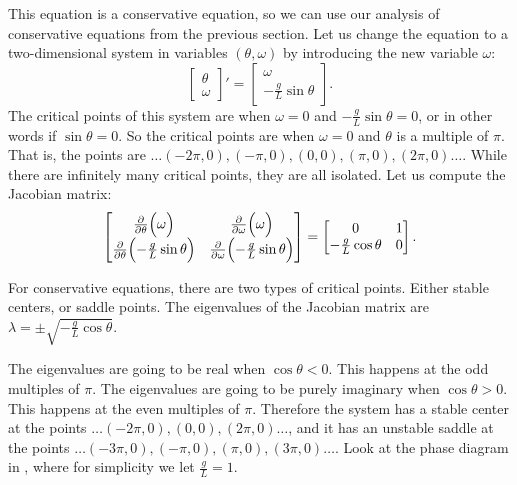 \begin{mywrapfigsimp}[8]{1.45in}{1.75in}
\noindent
{}
\end{mywrapfigsimp}
This equation is a conservative
equation, so we can use our analysis of conservative equations
from the previous section.
Let us change the equation to a two-dimensional
system in variables $(\theta,\omega)$ by introducing the new
variable $\omega$:
\begin{equation*}
\begin{bmatrix}
\theta \\ \omega
\end{bmatrix} '
=
\begin{bmatrix}
\omega \\
- \frac{g}{L} \sin \theta
\end{bmatrix} .
\end{equation*}
The critical points of this system are when $\omega = 0$ and $-\frac{g}{L}
\sin \theta = 0$, or in other words if $\sin \theta = 0$.  So the critical
points are when $\omega = 0$ and $\theta$ is a multiple of $\pi$.  That is,
the points are $\ldots (-2\pi,0), (-\pi,0), (0,0), (\pi,0), (2\pi,0)
\ldots$.  While there are infinitely many critical points, they are all isolated.
Let us compute the Jacobian matrix:
\begin{equation*}
\begin{bmatrix}
\frac{\partial}{\partial \theta} \Bigl( \omega \Bigr) & 
\frac{\partial}{\partial \omega} \Bigl( \omega \Bigr) \\
\frac{\partial}{\partial \theta} \Bigl( - \frac{g}{L} \sin \theta \Bigr) & 
\frac{\partial}{\partial \omega} \Bigl( - \frac{g}{L} \sin \theta \Bigr)
\end{bmatrix}
=
\begin{bmatrix}
0 & 1 \\
- \frac{g}{L} \cos \theta & 0
\end{bmatrix} .
\end{equation*}

For conservative equations, there are two types of
critical points.  Either stable centers, or saddle points.  The eigenvalues
of the Jacobian matrix are $\lambda = \pm \sqrt{-\frac{g}{L}\cos \theta}$.

The
eigenvalues are going to be real when $\cos \theta < 0$.  This happens at the odd multiples of $\pi$.
The
eigenvalues are going to be purely imaginary 
when $\cos \theta > 0$.  This happens at the even
multiples of $\pi$.  Therefore the system has a stable center at
the points $\ldots (-2\pi,0), (0,0), (2\pi,0) \ldots$, and it has an
unstable saddle at
the points $\ldots (-3\pi,0), (-\pi,0), (\pi,0), (3\pi,0) \ldots$.  Look at the
phase diagram in ,
where for simplicity we let $\frac{g}{L} = 1$.

